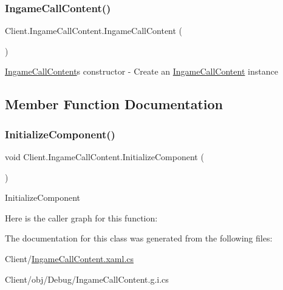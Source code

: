 \subsubsection{\texorpdfstring{Ingame\+Call\+Content()}{IngameCallContent()}}
{\footnotesize\ttfamily Client.\+Ingame\+Call\+Content.\+Ingame\+Call\+Content (\begin{DoxyParamCaption}{ }\end{DoxyParamCaption})\hspace{0.3cm}{\ttfamily [inline]}}

\hyperlink{class_client_1_1_ingame_call_content}{Ingame\+Call\+Content}\textquotesingle{}s constructor -\/ Create an \hyperlink{class_client_1_1_ingame_call_content}{Ingame\+Call\+Content} instance 

\subsection{Member Function Documentation}
\mbox{\label{class_client_1_1_ingame_call_content_a4eb1a66c48e66c19ce568a7a2a25ce9e}} 
\subsubsection{\texorpdfstring{Initialize\+Component()}{InitializeComponent()}}
{\footnotesize\ttfamily void Client.\+Ingame\+Call\+Content.\+Initialize\+Component (\begin{DoxyParamCaption}{ }\end{DoxyParamCaption})\hspace{0.3cm}{\ttfamily [inline]}}



Initialize\+Component 

Here is the caller graph for this function\+:


The documentation for this class was generated from the following files\+:\begin{DoxyCompactItemize}
\item 
Client/\hyperlink{_ingame_call_content_8xaml_8cs}{Ingame\+Call\+Content.\+xaml.\+cs}\item 
Client/obj/\+Debug/Ingame\+Call\+Content.\+g.\+i.\+cs\end{DoxyCompactItemize}
